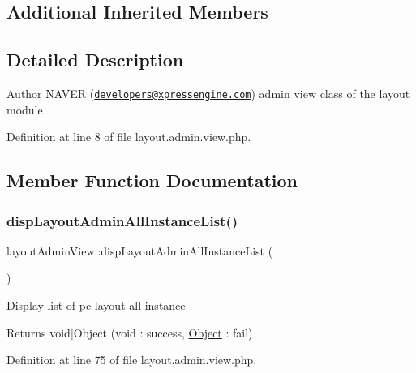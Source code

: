 \subsection*{Additional Inherited Members}


\subsection{Detailed Description}
\begin{DoxyAuthor}{Author}
N\+A\+V\+ER (\href{mailto:developers@xpressengine.com}{\tt developers@xpressengine.\+com}) admin view class of the layout module 
\end{DoxyAuthor}


Definition at line 8 of file layout.\+admin.\+view.\+php.



\subsection{Member Function Documentation}
\hypertarget{classlayoutAdminView_a278b148cb2673f86c08fe932b1db38e8}{}\label{classlayoutAdminView_a278b148cb2673f86c08fe932b1db38e8} 
\subsubsection{\texorpdfstring{disp\+Layout\+Admin\+All\+Instance\+List()}{dispLayoutAdminAllInstanceList()}}
{\footnotesize\ttfamily layout\+Admin\+View\+::disp\+Layout\+Admin\+All\+Instance\+List (\begin{DoxyParamCaption}{ }\end{DoxyParamCaption})}

Display list of pc layout all instance \begin{DoxyReturn}{Returns}
void$\vert$\+Object (void \+: success, \hyperlink{classObject}{Object} \+: fail) 
\end{DoxyReturn}


Definition at line 75 of file layout.\+admin.\+view.\+php.

\hypertarget{classlayoutAdminView_a48e095b862b7cb1482e94fec3c7624cc}{}\label{classlayoutAdminView_a48e095b862b7cb1482e94fec3c7624cc} 
